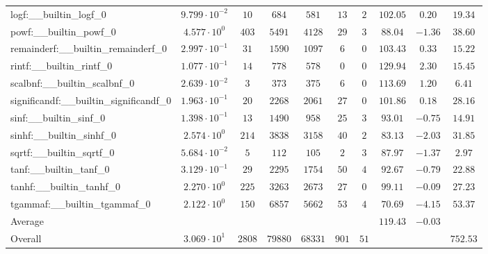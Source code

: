 \begin{tabular}{|l|c|c|c|c|c|c|c|c|c|}
logf:\_\_builtin\_logf\_0                 & $ 9.799 \cdot 10^{-2} $ & $ 10     $ & $ 684   $ & $ 581   $ & $ 13  $ & $ 2  $ & $ 102.05      $ & $ 0.20    $ & $ 19.34   $ \\
powf:\_\_builtin\_powf\_0                 & $ 4.577 \cdot 10^{0}  $ & $ 403    $ & $ 5491  $ & $ 4128  $ & $ 29  $ & $ 3  $ & $ 88.04       $ & $ -1.36   $ & $ 38.60   $ \\
remainderf:\_\_builtin\_remainderf\_0     & $ 2.997 \cdot 10^{-1} $ & $ 31     $ & $ 1590  $ & $ 1097  $ & $ 6   $ & $ 0  $ & $ 103.43      $ & $ 0.33    $ & $ 15.22   $ \\
rintf:\_\_builtin\_rintf\_0               & $ 1.077 \cdot 10^{-1} $ & $ 14     $ & $ 778   $ & $ 578   $ & $ 0   $ & $ 0  $ & $ 129.94      $ & $ 2.30    $ & $ 15.45   $ \\
scalbnf:\_\_builtin\_scalbnf\_0           & $ 2.639 \cdot 10^{-2} $ & $ 3      $ & $ 373   $ & $ 375   $ & $ 6   $ & $ 0  $ & $ 113.69      $ & $ 1.20    $ & $ 6.41    $ \\
significandf:\_\_builtin\_significandf\_0 & $ 1.963 \cdot 10^{-1} $ & $ 20     $ & $ 2268  $ & $ 2061  $ & $ 27  $ & $ 0  $ & $ 101.86      $ & $ 0.18    $ & $ 28.16   $ \\
sinf:\_\_builtin\_sinf\_0                 & $ 1.398 \cdot 10^{-1} $ & $ 13     $ & $ 1490  $ & $ 958   $ & $ 25  $ & $ 3  $ & $ 93.01       $ & $ -0.75   $ & $ 14.91   $ \\
sinhf:\_\_builtin\_sinhf\_0               & $ 2.574 \cdot 10^{0}  $ & $ 214    $ & $ 3838  $ & $ 3158  $ & $ 40  $ & $ 2  $ & $ 83.13       $ & $ -2.03   $ & $ 31.85   $ \\
sqrtf:\_\_builtin\_sqrtf\_0               & $ 5.684 \cdot 10^{-2} $ & $ 5      $ & $ 112   $ & $ 105   $ & $ 2   $ & $ 3  $ & $ 87.97       $ & $ -1.37   $ & $ 2.97    $ \\
tanf:\_\_builtin\_tanf\_0                 & $ 3.129 \cdot 10^{-1} $ & $ 29     $ & $ 2295  $ & $ 1754  $ & $ 50  $ & $ 4  $ & $ 92.67       $ & $ -0.79   $ & $ 22.88   $ \\
tanhf:\_\_builtin\_tanhf\_0               & $ 2.270 \cdot 10^{0}  $ & $ 225    $ & $ 3263  $ & $ 2673  $ & $ 27  $ & $ 0  $ & $ 99.11       $ & $ -0.09   $ & $ 27.23   $ \\
tgammaf:\_\_builtin\_tgammaf\_0           & $ 2.122 \cdot 10^{0}  $ & $ 150    $ & $ 6857  $ & $ 5662  $ & $ 53  $ & $ 4  $ & $ 70.69       $ & $ -4.15   $ & $ 53.37   $ \\
\hline
Average                                   & $                     $ & $        $ & $       $ & $       $ & $     $ & $    $ & $ 119.43      $ & $ -0.03   $ & $         $ \\
\hline
Overall                                   & $ 3.069 \cdot 10^{1}  $ & $ 2808   $ & $ 79880 $ & $ 68331 $ & $ 901 $ & $ 51 $ & $             $ & $         $ & $ 752.53  $ \\
\hline
\end{tabular}

